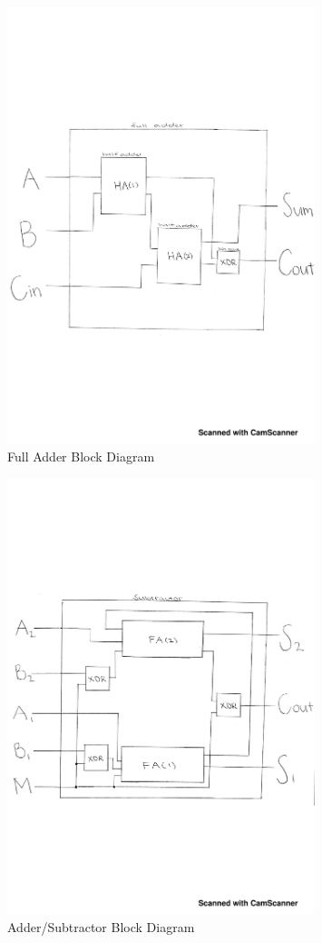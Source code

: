 \documentclass[11pt]{article}
\begin{document}
\begin{figure}\centering
	\includegraphics[width=0.8\textwidth,trim=0cm 7.5cm 0cm 7.5cm,clip]{full_adder_block_diagram}
	\caption{Full Adder Block Diagram}
	\label{fig:full_adder_diagram}	
\end{figure}

\begin{figure}\centering
	\includegraphics[width=0.8\textwidth,trim=0cm 7.5cm 0cm 7.5cm,clip]{subtractor_block_diagram} 
	\caption{Adder/Subtractor Block Diagram}
	\label{fig:subtractor_diagram}
\end{figure}
\end{document}
